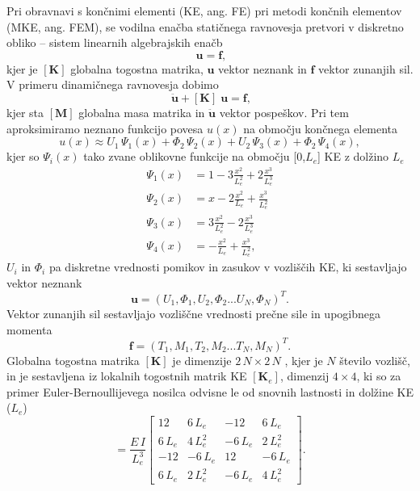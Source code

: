 Pri obravnavi s končnimi elementi (KE, ang. FE) pri metodi končnih elementov (MKE, ang. FEM), se vodilna enačba statičnega ravnovesja pretvori v diskretno obliko -- sistem linearnih algebrajskih enačb
\begin{equation}
    [\mathbf{K}]\;\mathbf{u} = \mathbf{f},
\end{equation}
kjer je $[\mathbf{K}]$ globalna togostna matrika, $\mathbf{u}$ vektor neznank in $\mathbf{f}$ vektor zunanjih sil. V primeru dinamičnega ravnovesja dobimo
\begin{equation}
    [\mathbf{M}]\;\ddot{\mathbf{u}} + [\mathbf{K}]\;\mathbf{u} = \mathbf{f},
\end{equation}
kjer sta $[\mathbf{M}]$ globalna masa matrika in $\ddot{\mathbf{u}}$ vektor pospeškov. Pri tem aproksimiramo neznano funkcijo povesa $u(x)$ na območju končnega elementa
\begin{equation}
    u(x) \approx U_1\,\Psi_1(x) + \Phi_2\,\Psi_2(x) + U_2\,\Psi_3(x) + \Phi_2\,\Psi_4(x),
\end{equation}
kjer so $\Psi_i(x)$ tako zvane oblikovne funkcije na območju [$0$,$L_e$] KE z dolžino $L_e$
\begin{align}
    \Psi_1(x) &= 1-3\frac{x^2}{L_e^2}+2\frac{x^3}{L_e^3}\\\nonumber
    \Psi_2(x) &= x-2\frac{x^2}{L_e}+ \frac{x^3}{L_e^2}\\\nonumber
    \Psi_3(x) &= 3\frac{x^2}{L_e^2}-2\frac{x^3}{L_e^3}\\\nonumber
    \Psi_4(x) &= -\frac{x^2}{L_e}+ \frac{x^3}{L_e^2},
\end{align}
$U_i$ in $\Phi_i$ pa diskretne vrednosti pomikov in zasukov v vozliščih KE, ki sestavljajo vektor neznank
\begin{equation}
    \bm{u} = \left( U_1,\Phi_1,U_2,\Phi_2...U_N,\Phi_N \right)^T.
\end{equation}
Vektor zunanjih sil sestavljajo vozliščne vrednosti prečne sile in upogibnega momenta
\begin{equation}
    \bm{f} = \left( T_1,M_1,T_2,M_2...T_N,M_N \right)^T.
\end{equation}
Globalna togostna matrika $[\mathbf{K}]$ je dimenzije $2\,N\times 2\,N$ , kjer je $N$ število vozlišč, in je sestavljena iz lokalnih togostnih matrik KE $[\mathbf{K}_e]$, dimenzij $4\times 4$, ki so za primer Euler-Bernoullijevega nosilca odvisne le od snovnih lastnosti in dolžine KE ($L_e$)
\begin{equation}
    [\mathbf{K}_e] = \frac{E\,I}{L_e^3}\begin{bmatrix}
        12 & 6\,L_e & -12 & 6\,L_e\\
        6\,L_e & 4\,L_e^2 & -6\,L_e & 2\,L_e^2\\
        -12 & -6\,L_e & 12 & -6\,L_e\\
        6\,L_e & 2\,L_e^2 & -6\,L_e & 4\,L_e^2
    \end{bmatrix}.
\end{equation}

